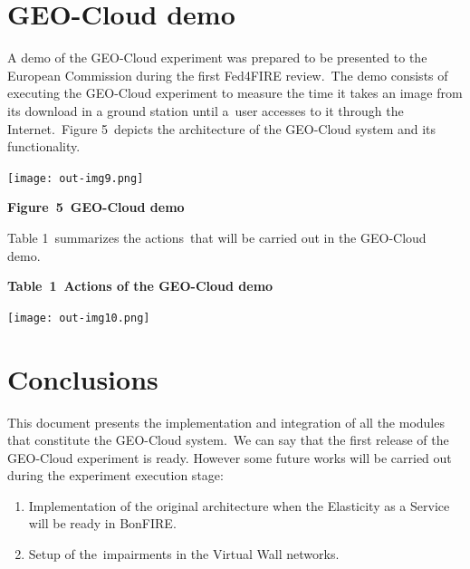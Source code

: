 \documentclass[a4paper]{article}
\newcounter{saveenum}
\newcommand\liststyleLFOxlvi{%
\renewcommand\theenumi{\arabic{enumi}}
\renewcommand\theenumii{\alph{enumii}}
\renewcommand\theenumiii{\roman{enumiii}}
\renewcommand\theenumiv{\arabic{enumiv}}
\renewcommand\labelenumi{\theenumi.}
\renewcommand\labelenumii{\theenumii.}
\renewcommand\labelenumiii{\theenumiii.}
\renewcommand\labelenumiv{\theenumiv.}
}
\begin{document}
\bigskip


\bigskip

\section{GEO-Cloud demo}

\bigskip

A demo of the GEO-Cloud experiment was prepared to be presented to the
European Commission during the first Fed4FIRE review.\ The demo
consists of executing the GEO-Cloud experiment to measure the time it
takes an image from its download in a ground station until a\ user
accesses to it through the Internet.\ Figure 5\ depicts the
architecture of the GEO-Cloud system and its functionality.


\bigskip


\bigskip

 \texttt{[image: out-img9.png]} 

{\centering\bfseries
\label{bkm:Ref390096338}Figure\ 5\ GEO-Cloud demo
\par}


\bigskip

Table 1\ summarizes the actions\ that will be carried out in the
GEO-Cloud demo.\ 

{\centering\bfseries
\label{bkm:Ref390096557}Table\ 1\ Actions of the GEO-Cloud demo
\par}

 \texttt{[image: out-img10.png]} 

\section[Conclusions]{Conclusions}
\hypertarget{Toc390097031}{}
\bigskip

This document presents the implementation and integration of all the
modules that constitute the GEO-Cloud system.\ We can say that the
first release of the GEO-Cloud experiment is ready. However some future
works will be carried out during the experiment execution stage:


\bigskip

\liststyleLFOxlvi
\setcounter{saveenum}{\value{enumi}}
\begin{enumerate}
\setcounter{enumi}{\value{saveenum}}
\item Implementation of the original architecture when the Elasticity as
a Service will be ready in BonFIRE.
\item Setup of the\ impairments in the Virtual Wall networks.
\end{enumerate}

\bigskip


\bigskip


\bigskip
\end{document}
